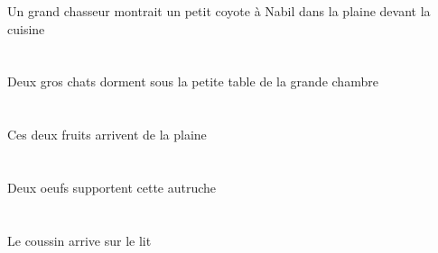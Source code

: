 \begin{exe}
Un grand chasseur montrait un petit coyote à Nabil dans la plaine devant la cuisine
\ex\glll
\INDDuAbs{}   \grosDDu{}   \chatDDuAbs{}    \DEFSgObl{}    \DEFSgObl{}   \grandBSg{}   \chambreBSgObl{}   \DE{}   \petitCSg{}   \tableCSgObl{}   \SOUS{}  \dormirViPrsDDu{}\\
\INDDuAbsP{}   \grosDDuP{}   \chatDDuAbsP{}    \DEFSgOblP{}    \DEFSgOblP{}   \grandBSgP{}   \chambreBSgOblP{}   \DEP{}   \petitCSgP{}   \tableCSgOblP{}   \SOUSP{}  \dormirViPrsDDuP{}\\
\INDDuAbsG{}   \grosDDuG{}   \chatDDuAbsG{}    \DEFSgOblG{}    \DEFSgOblG{}   \grandBSgG{}   \chambreBSgOblG{}   \DEG{}   \petitCSgG{}   \tableCSgOblG{}   \SOUSG{}  \dormirViPrsDDuG{}\\
Deux gros chats dorment sous la petite table de la grande chambre
\ex\glll
\DEMDuAbs{}   \fruitBDuAbs{}    \DEFSgObl{}   \plaineCSgObl{}   \DE{}  \arriverViPrsBDu{}\\
\DEMDuAbsP{}   \fruitBDuAbsP{}    \DEFSgOblP{}   \plaineCSgOblP{}   \DEP{}  \arriverViPrsBDuP{}\\
\DEMDuAbsG{}   \fruitBDuAbsG{}    \DEFSgOblG{}   \plaineCSgOblG{}   \DEG{}  \arriverViPrsBDuG{}\\
Ces deux fruits arrivent de la plaine
\ex\glll
\INDDuErg{}   \oeufDDuErg{}   \DEMSgAbs{}   \autrucheDSgAbs{}  \supporterVtPrsDSg{}\\
\INDDuErgP{}   \oeufDDuErgP{}   \DEMSgAbsP{}   \autrucheDSgAbsP{}  \supporterVtPrsDSgP{}\\
\INDDuErgG{}   \oeufDDuErgG{}   \DEMSgAbsG{}   \autrucheDSgAbsG{}  \supporterVtPrsDSgG{}\\
Deux oeufs supportent cette autruche
\ex\glll
\DEFSgAbs{}   \coussinASgAbs{}    \DEFSgObl{}   \litDSgObl{}   \SUR{}  \arriverViPrsASg{}\\
\DEFSgAbsP{}   \coussinASgAbsP{}    \DEFSgOblP{}   \litDSgOblP{}   \SURP{}  \arriverViPrsASgP{}\\
\DEFSgAbsG{}   \coussinASgAbsG{}    \DEFSgOblG{}   \litDSgOblG{}   \SURG{}  \arriverViPrsASgG{}\\
Le coussin arrive sur le lit
\ex\glll
\INDSgErg{}   \petitDSg{}   \blancDSg{}   \autrucheDSgErg{}    \DEFSgObl{}   \maisonDSgObl{}   \DEVANT{}   \INDSgAbs{}   \noirBSg{}   \theBSgAbs{}  \boireVtPrsBSg{}\\
\INDSgErgP{}   \petitDSgP{}   \blancDSgP{}   \autrucheDSgErgP{}    \DEFSgOblP{}   \maisonDSgOblP{}   \DEVANTP{}   \INDSgAbsP{}   \noirBSgP{}   \theBSgAbsP{}  \boireVtPrsBSgP{}\\
\INDSgErgG{}   \petitDSgG{}   \blancDSgG{}   \autrucheDSgErgG{}    \DEFSgOblG{}   \maisonDSgOblG{}   \DEVANTG{}   \INDSgAbsG{}   \noirBSgG{}   \theBSgAbsG{}  \boireVtPrsBSgG{}\\

\end{exe}
